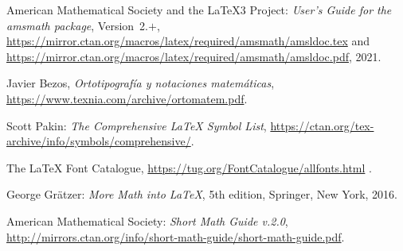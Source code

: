 \documentclass{article}
\numberwithin{equation}{section}
\theoremstyle{plain}
\theoremstyle{definition}
\theoremstyle{remark}
\begin{document}
%




\begin{thebibliography}{99}
\raggedright

 American Mathematical Society and the \LaTeX3 Project:
  \emph{User's Guide for the \textnormal{\ttfamily amsmath} package},
  Version~2.$+$,
  \url{https://mirror.ctan.org/macros/latex/required/amsmath/amsldoc.tex} and
  \url{https://mirror.ctan.org/macros/latex/required/amsmath/amsldoc.pdf},
  2021.

 Javier Bezos, \emph{Ortotipografía y notaciones matemáticas}, \url{https://www.texnia.com/archive/ortomatem.pdf}.

 Scott Pakin:
  \emph{The Comprehensive \LaTeX{} Symbol List},
  \url{https://ctan.org/tex-archive/info/symbols/comprehensive/}.

 The \LaTeX{} Font Catalogue, 
  \url{https://tug.org/FontCatalogue/allfonts.html} .

 George Gr\"atzer: \textit{More Math into \LaTeX},
   5th edition, Springer, New York, 2016.

 American Mathematical Society: \emph{Short Math Guide v.2.0}, \url{http://mirrors.ctan.org/info/short-math-guide/short-math-guide.pdf}.

\end{thebibliography}
\end{document}
